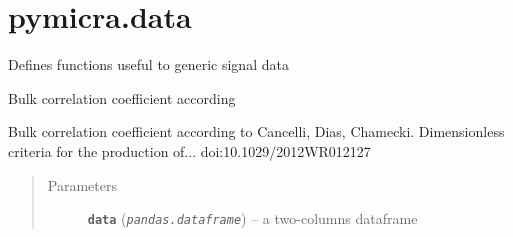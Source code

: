 \documentclass[a4paper,10pt,oneside]{sphinxmanual}
\begin{document}
\section{pymicra.data}
\label{pymicra:pymicra-data}\label{pymicra:module-pymicra.data}
Defines functions useful to generic signal data

\begin{fulllineitems}
\label{pymicra:pymicra.data.bulkCorr}
Bulk correlation coefficient according

Bulk correlation coefficient according to
Cancelli, Dias, Chamecki. Dimensionless criteria for the production of...
doi:10.1029/2012WR012127
\begin{quote}\begin{description}
\item[{Parameters}] \leavevmode
\textbf{\texttt{data}} (\emph{\texttt{pandas.dataframe}}) -- a two-columns dataframe

\end{description}\end{quote}

\end{fulllineitems}

\end{document}
